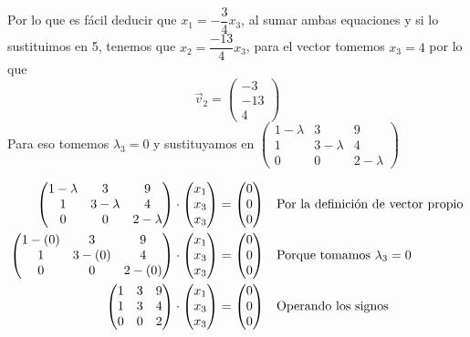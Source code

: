 \documentclass[letterpaper]{article}
\renewcommand{\*}{\cdot}
\theoremstyle{definition}
\begin{document}
Por lo que es fácil deducir que $ x_1 =- \dfrac{3}{4}x_3 $, al sumar ambas equaciones y si lo sustituimos en 5, tenemos que $ x_2 = \dfrac{-13}{4}x_3 $, para el vector tomemos $ x_3 = 4 $
por lo que \[ \vec{v}_2 = \begin{pmatrix}
-3\\
-13\\
4
\end{pmatrix} \]
Para eso tomemos $ \lambda_3 = 0 $ y sustituyamos en $ \begin{pmatrix}
1- \lambda & 3 & 9\\
1 & 3 -\lambda & 4\\
0 & 0 & 2- \lambda 
\end{pmatrix} $

\begin{align*}
	\begin{pmatrix}
	1- \lambda & 3 & 9\\
	1 & 3 -\lambda & 4\\
	0 & 0 & 2- \lambda 
	\end{pmatrix} \* \begin{pmatrix}
	x_1\\
	x_3\\
	x_3
	\end{pmatrix} &= \begin{pmatrix}
	0\\
	0\\
	0
	\end{pmatrix} && \text{Por la definición de vector propio}\\ 
	\begin{pmatrix}
	1- (0) & 3 & 9\\
	1 & 3 -(0) & 4\\
	0 & 0 & 2- (0) 
	\end{pmatrix} \* \begin{pmatrix}
	x_1\\
	x_3\\
	x_3
	\end{pmatrix} &= \begin{pmatrix}
	0\\
	0\\
	0
	\end{pmatrix} && \text{Porque tomamos $ \lambda_3 = 0 $}\\
	\begin{pmatrix}
	1 & 3 & 9\\
	1 & 3 & 4\\
	0 & 0 & 2 
	\end{pmatrix} \* \begin{pmatrix}
	x_1\\
	x_3\\
	x_3
	\end{pmatrix} &= \begin{pmatrix}
	0\\
	0\\
	0
	\end{pmatrix} && \text{Operando los signos}\\
\end{align*}
\end{document}
